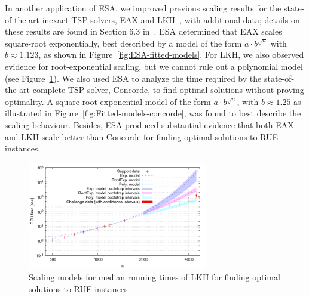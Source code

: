 \documentclass[aic]{iosart2x}
\begin{document}
In another application of ESA, we improved previous scaling results for the state-of-the-art inexact TSP solvers, EAX and LKH~\cite{DubEtAl15}, with additional data; details on these results are found in Section 6.3 in~\cite{Mu15}. ESA determined that EAX scales square-root exponentially, best described by a model of the form $a\cdot b^{\sqrt{n}}$ with $b\approx 1.123$, as shown in Figure~\ref{fig:ESA-fitted-models}. For LKH, we also observed evidence for root-exponential scaling, but we cannot rule out a polynomial model (see Figure~\ref{fig:Fitted-models-LKH}). We also used ESA to analyze the time required by the state-of-the-art complete TSP solver, Concorde, to find optimal solutions without proving optimality. A square-root exponential model of the form $a\cdot b^{\sqrt{n}}$, with $b \approx 1.25$ as illustrated in Figure~\ref{fig:Fitted-models-concorde}, was found to best describe the scaling behaviour. Besides, ESA produced substantial evidence that both EAX and LKH scale better than Concorde for finding optimal solutions to RUE instances.
\begin{figure}[t]
\noindent \begin{centering}
\includegraphics[width=0.7\textwidth]{LKH_fittedModels}  \vspace{-5mm} 

\par\end{centering}

\caption{Scaling models for median running times of LKH for finding optimal solutions to RUE instances.}\label{fig:Fitted-models-LKH} 
\end{figure}
\end{document}
